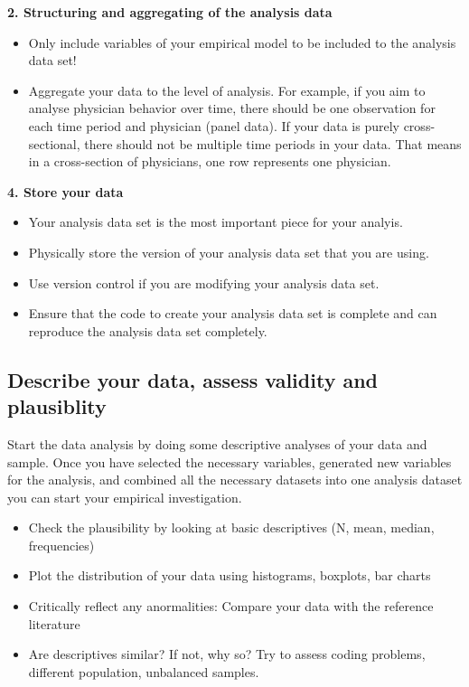 \documentclass[
]{book}
\providecommand{\tightlist}{%
  \setlength{\itemsep}{0pt}\setlength{\parskip}{0pt}}
\begin{document}
\textbf{2. Structuring and aggregating of the analysis data}

\begin{itemize}
\tightlist
\item
  Only include variables of your empirical model to be included to the
  analysis data set!
\item
  Aggregate your data to the level of analysis. For example, if you aim
  to analyse physician behavior over time, there should be one
  observation for each time period and physician (panel data). If your
  data is purely cross-sectional, there should not be multiple time
  periods in your data. That means in a cross-section of physicians, one
  row represents one physician.
\end{itemize}

\textbf{4. Store your data}

\begin{itemize}
\tightlist
\item
  Your analysis data set is the most important piece for your analyis.
\item
  Physically store the version of your analysis data set that you are
  using.
\item
  Use version control if you are modifying your analysis data set.
\item
  Ensure that the code to create your analysis data set is complete and
  can reproduce the analysis data set completely.
\end{itemize}

\hypertarget{describe-your-data-assess-validity-and-plausiblity}{%
\subsection{Describe your data, assess validity and
plausiblity}\label{describe-your-data-assess-validity-and-plausiblity}}

Start the data analysis by doing some descriptive analyses of your data
and sample. Once you have selected the necessary variables, generated
new variables for the analysis, and combined all the necessary datasets
into one analysis dataset you can start your empirical investigation.

\begin{itemize}
\tightlist
\item
  Check the plausibility by looking at basic descriptives (N, mean,
  median, frequencies)
\item
  Plot the distribution of your data using histograms, boxplots, bar
  charts
\item
  Critically reflect any anormalities: Compare your data with the
  reference literature
\item
  Are descriptives similar? If not, why so? Try to assess coding
  problems, different population, unbalanced samples.
\end{itemize}
\end{document}

